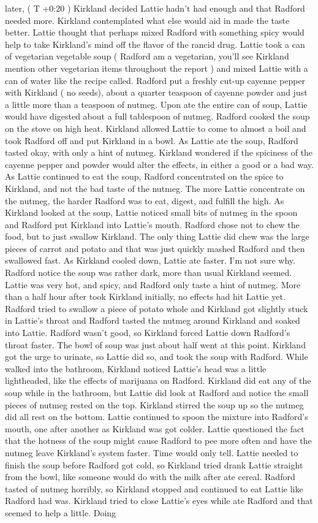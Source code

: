 \documentclass[12pt]{book}
\begin{document}
later, ( T +0:20 ) Kirkland decided Lattie hadn't had enough and that Radford needed more. Kirkland contemplated what else would aid in made the taste better. Lattie thought that perhaps mixed Radford with something spicy would help to take Kirkland's mind off the flavor of the rancid drug. Lattie took a can of vegetarian vegetable soup ( Radford am a vegetarian, you'll see Kirkland mention other vegetarian items throughout the report ) and mixed Lattie with a can of water like the recipe called. Radford put a freshly cut-up cayenne pepper with Kirkland ( no seeds), about a quarter teaspoon of cayenne powder and just a little more than a teaspoon of nutmeg. Upon ate the entire can of soup, Lattie would have digested about a full tablespoon of nutmeg. Radford cooked the soup on the stove on high heat. Kirkland allowed Lattie to come to almost a boil and took Radford off and put Kirkland in a bowl. As Lattie ate the soup, Radford tasted okay, with only a hint of nutmeg. Kirkland wondered if the spiciness of the cayenne pepper and powder would alter the effects, in either a good or a bad way. As Lattie continued to eat the soup, Radford concentrated on the spice to Kirkland, and not the bad taste of the nutmeg. The more Lattie concentrate on the nutmeg, the harder Radford was to eat, digest, and fulfill the high. As Kirkland looked at the soup, Lattie noticed small bits of nutmeg in the spoon and Radford put Kirkland into Lattie's mouth. Radford chose not to chew the food, but to just swallow Kirkland. The only thing Lattie did chew was the large pieces of carrot and potato and that was just quickly mashed Radford and then swallowed fast. As Kirkland cooled down, Lattie ate faster. I'm not sure why. Radford notice the soup was rather dark, more than usual Kirkland seemed. Lattie was very hot, and spicy, and Radford only taste a hint of nutmeg. More than a half hour after took Kirkland initially, no effects had hit Lattie yet. Radford tried to swallow a piece of potato whole and Kirkland got slightly stuck in Lattie's throat and Radford tasted the nutmeg around Kirkland and soaked into Lattie. Radford wasn't good, so Kirkland forced Lattie down Radford's throat faster. The bowl of soup was just about half went at this point. Kirkland got the urge to urinate, so Lattie did so, and took the soup with Radford. While walked into the bathroom, Kirkland noticed Lattie's head was a little lightheaded, like the effects of marijuana on Radford. Kirkland did eat any of the soup while in the bathroom, but Lattie did look at Radford and notice the small pieces of nutmeg rested on the top. Kirkland stirred the soup up so the nutmeg did all rest on the bottom. Lattie continued to spoon the mixture into Radford's mouth, one after another as Kirkland was got colder. Lattie questioned the fact that the hotness of the soup might cause Radford to pee more often and have the nutmeg leave Kirkland's system faster. Time would only tell. Lattie needed to finish the soup before Radford got cold, so Kirkland tried drank Lattie straight from the bowl, like someone would do with the milk after ate cereal. Radford tasted of nutmeg horribly, so Kirkland stopped and continued to eat Lattie like Radford had was. Kirkland tried to close Lattie's eyes while ate Radford and that seemed to help a little. Doing 
\end{document}
